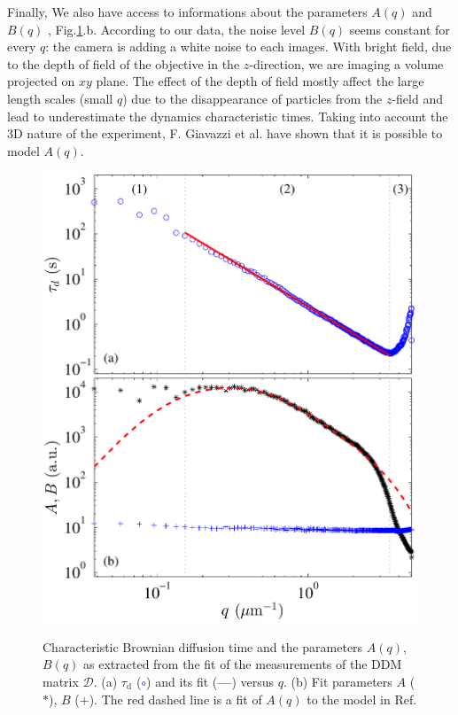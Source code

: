 \documentclass[prb,reprint,amsmath,amssymb]{revtex4-1}
\newcommand{\tg}[1]{{\color{magenta}#1}} %
\begin{document}
Finally, We also have access to informations about the parameters $A(q)$ and $B(q)$ , Fig.\ref{FitDiffColl}.b. According to our data, the noise level $B(q)$ seems constant for every $q$: the camera is adding a white noise to each images. With bright field, due to the depth of field of the objective in the $z$-direction, we are imaging a volume projected on $xy$ plane. The effect of the depth of field mostly affect the large length scales (small $q$) due to the disappearance of particles from the $z$-field and lead to underestimate the dynamics characteristic times\cite {4_Martinez20121637}. Taking into account the 3D nature of the experiment,  F. Giavazzi et al.\citep{3_DDM3D} have shown that it is possible to model $A(q)$.

\begin{figure}
	\includegraphics[width=\linewidth]{DiffusionColloids.pdf}\\
	\caption{Characteristic Brownian diffusion time and the parameters $A(q)$, $B(q)$ \tg{as extracted from the fit of the measurements of the DDM matrix $\mathcal{D}$. (a) $\tau_\text{d}$ (\textcolor{blue}{$\circ$}) and its fit (\textcolor{red}{\textbf{---}}) versus $q$. (b) Fit parameters $A$ ($\ast$), $B$ (\textcolor{blue}{+}). The red dashed line is a fit of $A(q)$ to the model in Ref\citep{3_DDM3D}.} }
	\label{FitDiffColl}
\end{figure}
\end{document}
